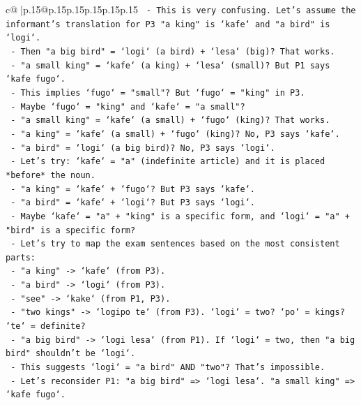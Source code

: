 \documentclass{article}
\begin{document}
{\begin{supertabular}{c@{$\;$}|p{.15\linewidth}@{}p{.15\linewidth}p{.15\linewidth}p{.15\linewidth}p{.15\linewidth}p{.15\linewidth}}
{{{\texttt{              {-} This is very confusing. Let's assume the informant's translation for P3 "a king" is `kafe` and "a bird" is `logi`.} \\
\texttt{              {-} Then "a big bird" = `logi` (a bird) + `lesa` (big)? That works.} \\
\texttt{              {-} "a small king" = `kafe` (a king) + `lesa` (small)? But P1 says `kafe fugo`.} \\
\texttt{              {-} This implies `fugo` = "small"? But `fugo` = "king" in P3.} \\
\texttt{              {-} Maybe `fugo` = "king" and `kafe` = "a small"?} \\
\texttt{                {-} "a small king" = `kafe` (a small) + `fugo` (king)? That works.} \\
\texttt{                {-} "a king" = `kafe` (a small) + `fugo` (king)? No, P3 says `kafe`.} \\
\texttt{                {-} "a bird" = `logi` (a big bird)? No, P3 says `logi`.} \\
\texttt{              {-} Let's try: `kafe` = "a" (indefinite article) and it is placed *before* the noun.} \\
\texttt{                {-} "a king" = `kafe` + `fugo`? But P3 says `kafe`.} \\
\texttt{                {-} "a bird" = `kafe` + `logi`? But P3 says `logi`.} \\
\texttt{              {-} Maybe `kafe` = "a" + "king" is a specific form, and `logi` = "a" + "bird" is a specific form?} \\
\texttt{              {-} Let's try to map the exam sentences based on the most consistent parts:} \\
\texttt{                {-} "a king" {-}> `kafe` (from P3).} \\
\texttt{                {-} "a bird" {-}> `logi` (from P3).} \\
\texttt{                {-} "see" {-}> `kake` (from P1, P3).} \\
\texttt{                {-} "two kings" {-}> `logipo te` (from P3). `logi` = two? `po` = kings? `te` = definite?} \\
\texttt{                {-} "a big bird" {-}> `logi lesa` (from P1). If `logi` = two, then "a big bird" shouldn't be `logi`.} \\
\texttt{                {-} This suggests `logi` = "a bird" AND "two"? That's impossible.} \\
\texttt{                {-} Let's reconsider P1: "a big bird" => `logi lesa`. "a small king" => `kafe fugo`.} \\
}}}
\end{supertabular}}
\end{document}
